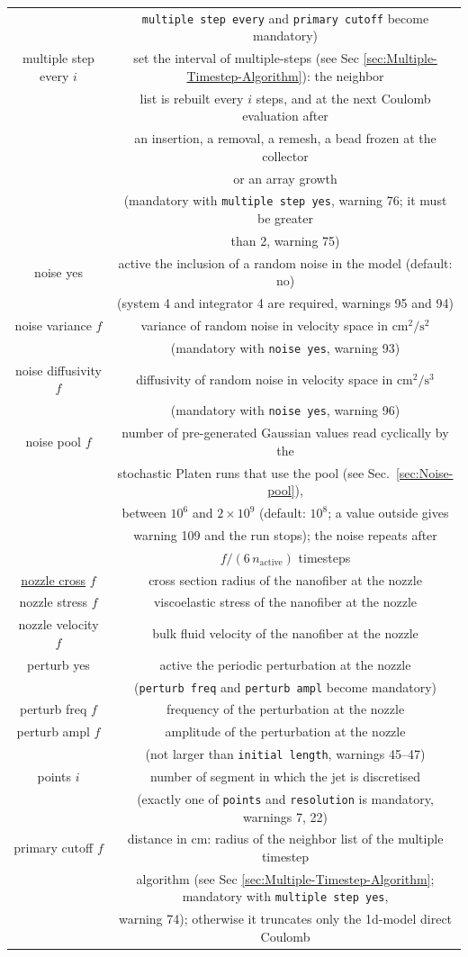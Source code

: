 \begin{longtable}{cc}
 & \texttt{multiple step every} and \texttt{primary cutoff} become mandatory)\tabularnewline
multiple step every $i$ & set the interval of multiple-steps (see Sec \ref{sec:Multiple-Timestep-Algorithm}): the neighbor\tabularnewline
 & list is rebuilt every $i$ steps, and at the next Coulomb evaluation after\tabularnewline
 & an insertion, a removal, a remesh, a bead frozen at the collector\tabularnewline
 & or an array growth\tabularnewline
 & (mandatory with \texttt{multiple step yes}, warning 76; it must be greater\tabularnewline
 & than 2, warning 75)\tabularnewline
noise yes & active the inclusion of a random noise in the model (default: no)\tabularnewline
 & (system 4 and integrator 4 are required, warnings 95 and 94)\tabularnewline
noise variance $f$ & variance of random noise in velocity space in $\text{cm}^{2}/\text{s}^{2}$\tabularnewline
 & (mandatory with \texttt{noise yes}, warning 93)\tabularnewline
noise diffusivity $f$ & diffusivity of random noise in velocity space in $\text{cm}^{2}/\text{s}^{3}$\tabularnewline
 & (mandatory with \texttt{noise yes}, warning 96)\tabularnewline
noise pool $f$ & number of pre-generated Gaussian values read cyclically by the\tabularnewline
 & stochastic Platen runs that use the pool (see Sec.~\ref{sec:Noise-pool}),\tabularnewline
 & between $10^{6}$ and $2\times10^{9}$ (default: $10^{8}$; a value outside gives\tabularnewline
 & warning 109 and the run stops); the noise repeats after\tabularnewline
 & $f/(6\,n_{\mathrm{active}})$ timesteps\tabularnewline
\uline{nozzle cross} $f$  & cross section radius of the nanofiber at the nozzle\tabularnewline
nozzle stress $f$  & viscoelastic stress of the nanofiber at the nozzle\tabularnewline
nozzle velocity $f$  & bulk fluid velocity of the nanofiber at the nozzle\tabularnewline
perturb yes  & active the periodic perturbation at the nozzle\tabularnewline
 & (\texttt{perturb freq} and \texttt{perturb ampl} become mandatory)\tabularnewline
perturb freq $f$  & frequency of the perturbation at the nozzle\tabularnewline
perturb ampl $f$  & amplitude of the perturbation at the nozzle\tabularnewline
 & (not larger than \texttt{initial length}, warnings 45--47)\tabularnewline
points $i$  & number of segment in which the jet is discretised\tabularnewline
 & (exactly one of \texttt{points} and \texttt{resolution} is mandatory, warnings 7, 22)\tabularnewline
primary cutoff $f$ & distance in cm: radius of the neighbor list of the multiple timestep\tabularnewline
 & algorithm (see Sec \ref{sec:Multiple-Timestep-Algorithm}; mandatory with \texttt{multiple step yes},\tabularnewline
 & warning 74); otherwise it truncates only the 1d-model direct Coulomb\tabularnewline

\end{longtable}

